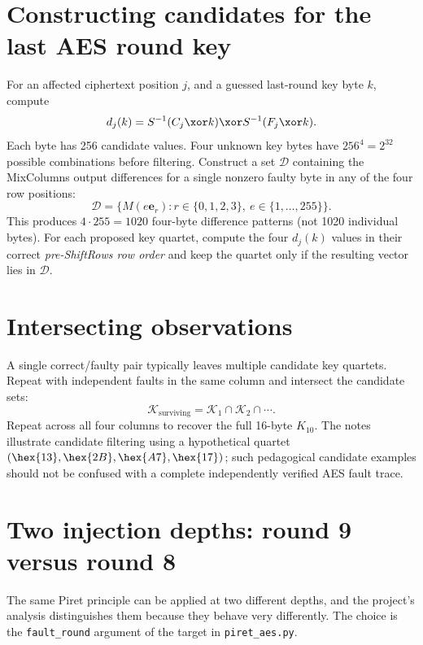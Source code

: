 \section{Constructing candidates for the last AES round key}
For an affected ciphertext position \(j\), and a guessed last-round key byte \(k\), compute
\[d_j(k)=S^{-1}(C_j\xor k)\xor S^{-1}(F_j\xor k).\]
Each byte has 256 candidate values. Four unknown key bytes have \(256^4=2^{32}\) possible combinations before filtering.
Construct a set \(\mathcal D\) containing the MixColumns output differences for a single nonzero faulty byte in any of the four row positions:
\[\mathcal D=\{M(e\mathbf e_r):r\in\{0,1,2,3\},\ e\in\{1,\ldots,255\}\}.\]
This produces \(4\cdot255=1020\) four-byte difference patterns (not 1020 individual bytes). For each proposed key quartet, compute the four \(d_j(k)\) values in their correct \emph{pre-ShiftRows row order} and keep the quartet only if the resulting vector lies in \(\mathcal D\).
\section{Intersecting observations}
A single correct/faulty pair typically leaves multiple candidate key quartets. Repeat with independent faults in the same column and intersect the candidate sets:
\[\mathcal K_{\mathrm{surviving}}=\mathcal K_1\cap\mathcal K_2\cap\cdots.\]
Repeat across all four columns to recover the full 16-byte \(K_{10}\). The notes illustrate candidate filtering using a hypothetical quartet \((\hex{13},\hex{2B},\hex{A7},\hex{17})\); such pedagogical candidate examples should not be confused with a complete independently verified AES fault trace.
\section{Two injection depths: round 9 versus round 8}
\label{sec:piret_two_models}
The same Piret principle can be applied at two different depths, and the project's
analysis distinguishes them because they behave very differently. The choice is
the \texttt{fault\_round} argument of the target in \texttt{piret\_aes.py}.

